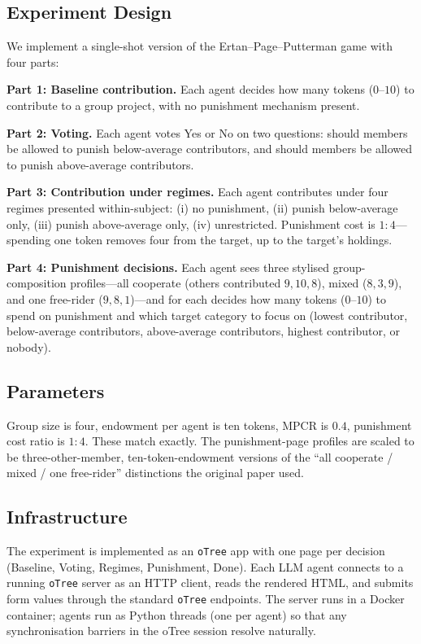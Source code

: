 \documentclass[12pt, a4paper]{article}
\begin{document}
\subsection{Experiment Design}

We implement a single-shot version of the Ertan--Page--Putterman game with four parts:

\textbf{Part 1: Baseline contribution.} Each agent decides how many tokens ($0$--$10$) to contribute to a group project, with no punishment mechanism present.

\textbf{Part 2: Voting.} Each agent votes Yes or No on two questions: should members be allowed to punish below-average contributors, and should members be allowed to punish above-average contributors.

\textbf{Part 3: Contribution under regimes.} Each agent contributes under four regimes presented within-subject: (i) no punishment, (ii) punish below-average only, (iii) punish above-average only, (iv) unrestricted. Punishment cost is $1{:}4$---spending one token removes four from the target, up to the target's holdings.

\textbf{Part 4: Punishment decisions.} Each agent sees three stylised group-composition profiles---all cooperate (others contributed $9, 10, 8$), mixed ($8, 3, 9$), and one free-rider ($9, 8, 1$)---and for each decides how many tokens ($0$--$10$) to spend on punishment and which target category to focus on (lowest contributor, below-average contributors, above-average contributors, highest contributor, or nobody).

\subsection{Parameters}

Group size is four, endowment per agent is ten tokens, MPCR is $0.4$, punishment cost ratio is $1{:}4$. These match \citet{ertan2009who} exactly. The punishment-page profiles are scaled to be three-other-member, ten-token-endowment versions of the ``all cooperate / mixed / one free-rider'' distinctions the original paper used.

\subsection{Infrastructure}

The experiment is implemented as an \texttt{oTree} app \citep{otree} with one page per decision (Baseline, Voting, Regimes, Punishment, Done). Each LLM agent connects to a running \texttt{oTree} server as an HTTP client, reads the rendered HTML, and submits form values through the standard \texttt{oTree} endpoints. The server runs in a Docker container; agents run as Python threads (one per agent) so that any synchronisation barriers in the oTree session resolve naturally.
\end{document}
